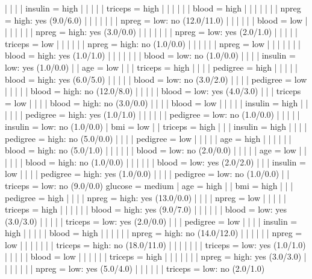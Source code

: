 |   |   |   |   insulin = high
|   |   |   |   |   triceps = high
|   |   |   |   |   |   blood = high
|   |   |   |   |   |   |   npreg = high: yes (9.0/6.0)
|   |   |   |   |   |   |   npreg = low: no (12.0/11.0)
|   |   |   |   |   |   blood = low
|   |   |   |   |   |   |   npreg = high: yes (3.0/0.0)
|   |   |   |   |   |   |   npreg = low: yes (2.0/1.0)
|   |   |   |   |   triceps = low
|   |   |   |   |   |   npreg = high: no (1.0/0.0)
|   |   |   |   |   |   npreg = low
|   |   |   |   |   |   |   blood = high: yes (1.0/1.0)
|   |   |   |   |   |   |   blood = low: no (1.0/0.0)
|   |   |   |   insulin = low: yes (1.0/0.0)
|   |   age = low
|   |   |   triceps = high
|   |   |   |   pedigree = high
|   |   |   |   |   blood = high: yes (6.0/5.0)
|   |   |   |   |   blood = low: no (3.0/2.0)
|   |   |   |   pedigree = low
|   |   |   |   |   blood = high: no (12.0/8.0)
|   |   |   |   |   blood = low: yes (4.0/3.0)
|   |   |   triceps = low
|   |   |   |   blood = high: no (3.0/0.0)
|   |   |   |   blood = low
|   |   |   |   |   insulin = high
|   |   |   |   |   |   pedigree = high: yes (1.0/1.0)
|   |   |   |   |   |   pedigree = low: no (1.0/0.0)
|   |   |   |   |   insulin = low: no (1.0/0.0)
|   bmi = low
|   |   triceps = high
|   |   |   insulin = high
|   |   |   |   pedigree = high: no (5.0/0.0)
|   |   |   |   pedigree = low
|   |   |   |   |   age = high
|   |   |   |   |   |   blood = high: no (5.0/1.0)
|   |   |   |   |   |   blood = low: no (2.0/0.0)
|   |   |   |   |   age = low
|   |   |   |   |   |   blood = high: no (1.0/0.0)
|   |   |   |   |   |   blood = low: yes (2.0/2.0)
|   |   |   insulin = low
|   |   |   |   pedigree = high: yes (1.0/0.0)
|   |   |   |   pedigree = low: no (1.0/0.0)
|   |   triceps = low: no (9.0/0.0)
glucose = medium
|   age = high
|   |   bmi = high
|   |   |   pedigree = high
|   |   |   |   npreg = high: yes (13.0/0.0)
|   |   |   |   npreg = low
|   |   |   |   |   triceps = high
|   |   |   |   |   |   blood = high: yes (9.0/7.0)
|   |   |   |   |   |   blood = low: yes (3.0/3.0)
|   |   |   |   |   triceps = low: yes (2.0/0.0)
|   |   |   pedigree = low
|   |   |   |   insulin = high
|   |   |   |   |   blood = high
|   |   |   |   |   |   npreg = high: no (14.0/12.0)
|   |   |   |   |   |   npreg = low
|   |   |   |   |   |   |   triceps = high: no (18.0/11.0)
|   |   |   |   |   |   |   triceps = low: yes (1.0/1.0)
|   |   |   |   |   blood = low
|   |   |   |   |   |   triceps = high
|   |   |   |   |   |   |   npreg = high: yes (3.0/3.0)
|   |   |   |   |   |   |   npreg = low: yes (5.0/4.0)
|   |   |   |   |   |   triceps = low: no (2.0/1.0)
